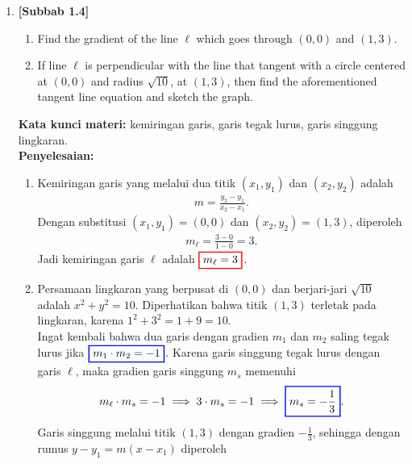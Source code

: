 \documentclass[10pt,openany,a4paper]{article}
\theoremstyle{definition}
\theoremstyle{definition}
\theoremstyle{plain}
\newenvironment{jawab}[2][tes]{%
\par\noindent\textbf{Kata kunci materi:} #1.\\
\textbf{Penyelesaian:} #2%
}{}
\begin{document}
\begin{enumerate}
    \item \textbf{[Subbab 1.4]} \begin{enumerate}
        \item Find the gradient of the line $\ell$ which goes through $(0,0)$ and $(1,3)$.
        \item If line $\ell$ is perpendicular with the line that tangent with a circle centered at $(0,0)$ and radius $\sqrt{10}$, at $(1,3)$, then find the aforementioned tangent line equation and sketch the graph.
    \end{enumerate}
    \begin{jawab}[kemiringan garis, garis tegak lurus, garis singgung lingkaran]{
        \begin{enumerate}
            \item Kemiringan garis yang melalui dua titik $(x_1,y_1)$ dan $(x_2,y_2)$ adalah
            \begin{align*}
                m = \frac{y_2 - y_1}{x_2 - x_1}.
            \end{align*}
            Dengan substitusi $(x_1,y_1)=(0,0)$ dan $(x_2,y_2)=(1,3)$, diperoleh
            \begin{align*}
                m_\ell = \frac{3 - 0}{1 - 0} = 3.
            \end{align*}
            Jadi kemiringan garis $\ell$ adalah $\colorlet{oldcolor}{.}
        \color{red}
        \setlength{\fboxrule}{1pt} \boxed{\color{oldcolor}m_\ell = 3}\color{oldcolor}$.
            \item Persamaan lingkaran yang berpusat di $(0,0)$ dan berjari-jari $\sqrt{10}$ adalah $x^2 + y^2 = 10$. Diperhatikan bahwa titik $(1,3)$ terletak pada lingkaran, karena $1^2 + 3^2 = 1 + 9 = 10$. \\
            Ingat kembali bahwa dua garis dengan gradien $m_1$ dan $m_2$ saling tegak lurus jika $\colorlet{oldcolor}{.}
        \color{blue}
        \setlength{\fboxrule}{1pt} \boxed{\color{oldcolor}m_1\cdot m_2=-1}\color{oldcolor}$. Karena garis singgung tegak lurus dengan garis $\ell$, maka gradien garis singgung $m_s$ memenuhi
            \begin{align*}
                m_\ell \cdot m_s = -1 \implies 3\cdot m_s = -1 \implies \colorlet{oldcolor}{.}
        \color{blue}
        \setlength{\fboxrule}{1pt} \boxed{\color{oldcolor}m_s = -\frac{1}{3}}\color{oldcolor}.
            \end{align*}
            Garis singgung melalui titik $(1,3)$ dengan gradien $-\frac{1}{3}$, sehingga dengan rumus $y - y_1 = m(x - x_1)$ diperoleh

\end{enumerate}}
\end{jawab}
\end{enumerate}
\end{document}
